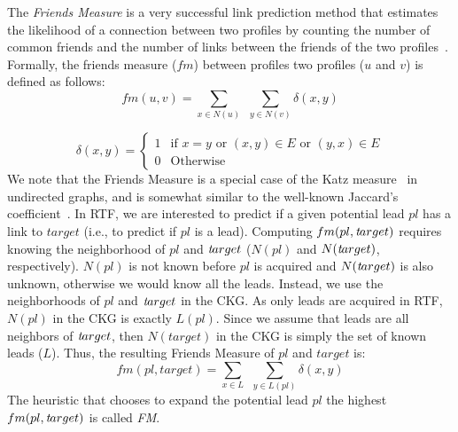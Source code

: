 \documentclass[prodmode,acmtecs]{acmsmall} %
\newcommand{\note}[2]{\textbf{\textsc{#1} says: \textit{#2}}}
\newcommand{\target}{{\textit target}}
\begin{document}
The \emph{Friends Measure} is a very successful link prediction method that estimates the likelihood of a connection between two profiles by counting the number of common friends and the number of links between the friends of the two profiles~\cite{fire2013linkPrediction}.
Formally, the friends measure ($fm$) between profiles two profiles ($u$ and $v$) is defined as follows:
\begin{equation}
fm(u,v)= \sum\limits_{x\in N(u)}~~\sum\limits_{y \in N(v)} \delta(x,y)
\end{equation}

\begin{equation}
\delta(x,y) = \begin{cases}
1 &\text{if $x=y$ or $(x,y)\in E$ or $(y,x) \in E$}\\
0 &\text{Otherwise}
\end{cases}
\end{equation}
We note that the Friends Measure is a special case of the Katz measure~\cite{katz1953aNewStatus} in undirected graphs, and is somewhat similar to the well-known Jaccard's coefficient~\cite{fire2014computationallyEfficient}. 
In RTF, we are interested to predict if a given potential lead $pl$ has a link to $target$ (i.e., to predict if $pl$ is a lead). Computing $fm(pl,\target)$ requires knowing the neighborhood of $pl$ and $\target$ ($N(pl)$ and $N(\target)$, respectively). $N(pl)$ is not known before $pl$ is acquired and $N(\target)$ is also unknown, otherwise we would know all the leads. Instead, we use the neighborhoods of $pl$ and $\target$ in the CKG. As only leads are acquired in RTF, $N(pl)$ in the CKG is exactly $L(pl)$. Since we assume that leads are all neighbors of $\target$, then $N(target)$ in the CKG is simply the set of known leads ($L$). Thus, the resulting Friends Measure of $pl$ and $target$ is:
\begin{equation}
fm(pl,target)= \sum\limits_{x\in L}~~\sum\limits_{y\in L(pl)  } \delta(x,y)
\end{equation}
\noindent The heuristic that chooses to expand the potential lead $pl$ the highest $fm(pl,\target)$ is called {\em FM}. 
\end{document}
